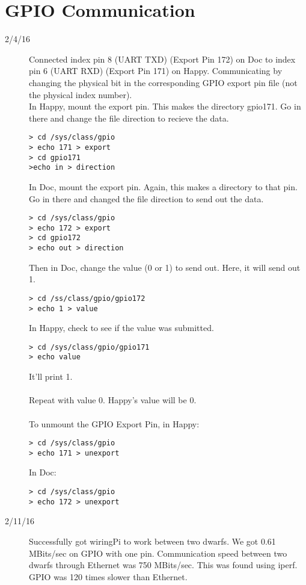 \section{GPIO Communication}
\begin{description}
\item [2/4/16]  Connected index pin 8 (UART TXD) (Export Pin 172) on Doc to index pin 6 (UART RXD) (Export Pin 171) on Happy. Communicating by changing the physical bit in the corresponding GPIO export pin file (not the physical index number).  \\

In Happy, mount the export pin. This makes the directory gpio171. Go in there and change the file direction to recieve the data.
\begin{lstlisting}
> cd /sys/class/gpio
> echo 171 > export
> cd gpio171
>echo in > direction
\end{lstlisting}
In Doc, mount the export pin. Again, this makes a directory to that pin. Go in there and changed the file direction to send out the data.
\begin{lstlisting}
> cd /sys/class/gpio 
> echo 172 > export 
> cd gpio172 
> echo out > direction
\end{lstlisting}
Then in Doc, change the value (0 or 1) to send out. Here, it will send out 1.
\begin{lstlisting}
> cd /ss/class/gpio/gpio172
> echo 1 > value
\end{lstlisting}
In Happy, check to see if the value was submitted.
\begin{lstlisting}
> cd /sys/class/gpio/gpio171
> echo value
\end{lstlisting}
It'll print 1. \\ \\
Repeat with value 0. Happy's value will be 0. \\ \\
To unmount the GPIO Export Pin, in Happy:
\begin{lstlisting}
> cd /sys/class/gpio
> echo 171 > unexport
\end{lstlisting}
In Doc:
\begin{lstlisting}
> cd /sys/class/gpio
> echo 172 > unexport
\end{lstlisting}

\item [2/11/16] Successfully got wiringPi to work between two dwarfs. We got 0.61 MBits/sec on GPIO with one pin. Communication speed between two dwarfs through Ethernet was 750 MBits/sec. This was found using iperf. GPIO was 120 times slower than Ethernet.


\end{description}
